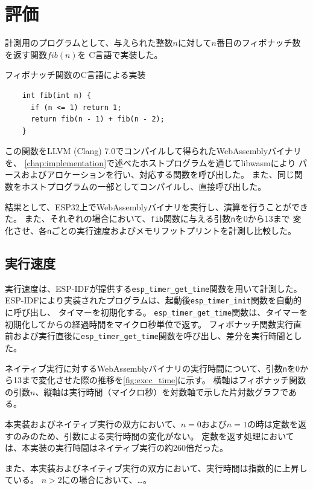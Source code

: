 \chapter{評価}
\label{chap:evaluation}

計測用のプログラムとして、与えられた整数$n$に対して$n$番目のフィボナッチ数を返す関数$fib(n)$を
C言語で実装した。

\begin{itembox}[l]{フィボナッチ関数のC言語による実装}
  \begin{verbatim}
    int fib(int n) {
      if (n <= 1) return 1;
      return fib(n - 1) + fib(n - 2);
    }
  \end{verbatim}
\end{itembox}

この関数をLLVM (Clang) 7.0でコンパイルして得られたWebAssemblyバイナリを、
\ref{chap:implementation}で述べたホストプログラムを通じてlibwasmにより
パースおよびアロケーションを行い、対応する関数を呼び出した。
また、同じ関数をホストプログラムの一部としてコンパイルし、直接呼び出した。

結果として、ESP32上でWebAssemblyバイナリを実行し、演算を行うことができた。
また、それぞれの場合において、\verb|fib|関数に与える引数\verb|n|を0から13まで
変化させ、各\verb|n|ごとの実行速度およびメモリフットプリントを計測し比較した。

\section{実行速度}

実行速度は、ESP-IDFが提供する\verb|esp_timer_get_time|関数を用いて計測した。
ESP-IDFにより実装されたプログラムは、起動後\verb|esp_timer_init|関数を自動的に呼び出し、
タイマーを初期化する。
\verb|esp_timer_get_time|関数は、タイマーを初期化してからの経過時間をマイクロ秒単位で返す。
フィボナッチ関数実行直前および実行直後に\verb|esp_timer_get_time|関数を呼び出し、差分を実行時間とした。

ネイティブ実行に対するWebAssemblyバイナリの実行時間について、引数\verb|n|を0から13まで変化させた際の推移を\ref{fig:exec_time}に示す。
横軸はフィボナッチ関数の引数$n$、縦軸は実行時間（マイクロ秒）を対数軸で示した片対数グラフである。

本実装およびネイティブ実行の双方において、$n=0$および$n=1$の時は定数を返すのみのため、引数による実行時間の変化がない。
定数を返す処理においては、本実装の実行時間はネイティブ実行の約260倍だった。

また、本実装およびネイティブ実行の双方において、実行時間は指数的に上昇している。
$n>2$にの場合において、…。

